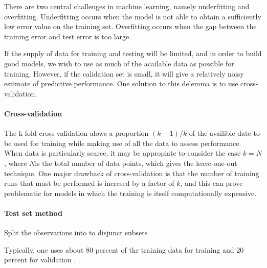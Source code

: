 \documentclass{scrartcl}
\begin{document}
There are two central challenges in machine learning, namely underfitting and overfitting. Underfitting occurs when the model is not able to obtain a sufficiently low error value on the training set. Overfitting occurs when the gap between the training error and test error is too large.

If the supply of data for training and testing will be limited, and in order to build good models, we wish to use as much of the acailable data as possible for training. However, if the calidation set is small, it will give a relatively noisy estimate of predictive performance. One solution to this delemma is to use cross-validation.

\paragraph{Cross-validation}  The k-fold cross-validation alows a proportion $(k-1)/k$ of the availible date to be used for training while making use of all the data to assess performance. When data is particularly scarce, it may be appropiate to consider the case $k=N$, where $N $is the total number of data points, which gives the leave-one-out technique. One major drawback of cross-validation is that the number of training runs that must be performed is incresed by a factor of $k$, and this can prove problematic for models in which the training is itself computationally expensive.

\paragraph{Test set method} Split the observarions into to disjunct subsets 

Typically, one uses about 80 percent of thr training data for training and 20 percent for validation \cite{Goodfellow2016}. 

\end{document}
